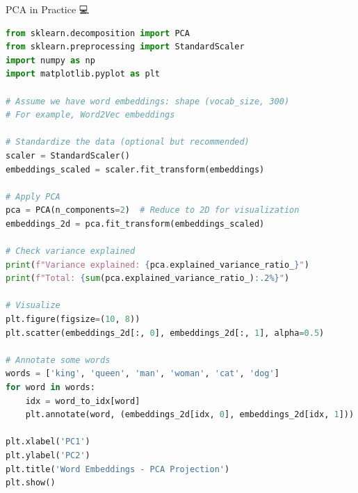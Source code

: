 \documentclass[aspectratio=169]{beamer}
\begin{document}
\begin{frame}[fragile]{PCA in Practice 💻}
\begin{lstlisting}[language=Python]
from sklearn.decomposition import PCA
from sklearn.preprocessing import StandardScaler
import numpy as np
import matplotlib.pyplot as plt

# Assume we have word embeddings: shape (vocab_size, 300)
# For example, Word2Vec embeddings

# Standardize the data (optional but recommended)
scaler = StandardScaler()
embeddings_scaled = scaler.fit_transform(embeddings)

# Apply PCA
pca = PCA(n_components=2)  # Reduce to 2D for visualization
embeddings_2d = pca.fit_transform(embeddings_scaled)

# Check variance explained
print(f"Variance explained: {pca.explained_variance_ratio_}")
print(f"Total: {sum(pca.explained_variance_ratio_):.2%}")

# Visualize
plt.figure(figsize=(10, 8))
plt.scatter(embeddings_2d[:, 0], embeddings_2d[:, 1], alpha=0.5)

# Annotate some words
words = ['king', 'queen', 'man', 'woman', 'cat', 'dog']
for word in words:
    idx = word_to_idx[word]
    plt.annotate(word, (embeddings_2d[idx, 0], embeddings_2d[idx, 1]))

plt.xlabel('PC1')
plt.ylabel('PC2')
plt.title('Word Embeddings - PCA Projection')
plt.show()
\end{lstlisting}
\end{frame}
\end{document}
